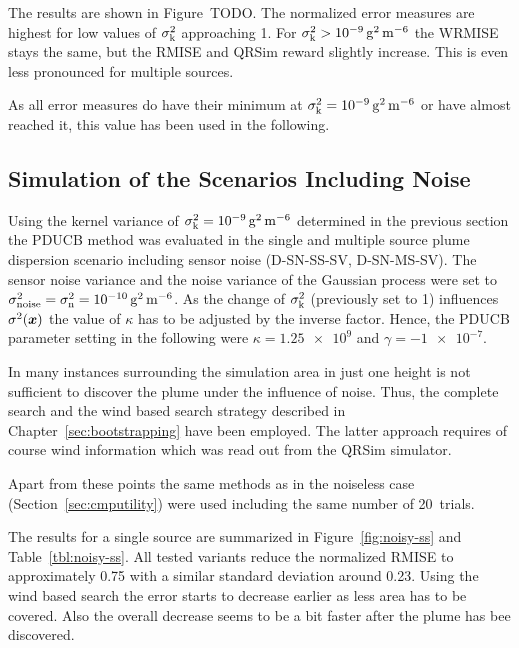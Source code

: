 The results are shown in Figure~TODO\@. The normalized error measures are 
highest for low values of $\sigma_{\mathrm{k}}^2$ approaching 1. For $\sigma\ped{k}^2 
> \SI{1e-9}{\gram\squared\per\meter\tothe{6}}$ the WRMISE stays the same, but 
the RMISE and QRSim reward slightly increase. This is even less pronounced for 
multiple sources.

As all error measures do have their minimum at $\sigma\ped{k}^2 
= \SI{1e-9}{\gram\squared\per\meter\tothe{6}}$ or have almost reached it, this 
value has been used in the following.

\subsection{Simulation of the Scenarios Including Noise}
Using the kernel variance of $\sigma\ped{k}^2 
= \SI{1e-9}{\gram\squared\per\meter\tothe{6}}$ determined in the previous 
section the PDUCB method was evaluated in the single and multiple source plume 
dispersion scenario including sensor noise (D-SN-SS-SV, D-SN-MS-SV). The sensor 
noise variance and the noise variance of the Gaussian process were set to 
$\sigma\ped{noise}^2 = \sigma\ped{n}^2 
= \SI{1e-10}{\gram\squared\per\meter\tothe{6}}$.  As the change of 
$\sigma_{\mathrm{k}}^2$ (previously set to 1) influences $\sigma^2(\bm{x})$ the value 
of $\kappa$ has to be adjusted by the inverse factor. Hence, the PDUCB parameter 
setting in the following were $\kappa = \num{1.25e9}$ and $\gamma 
= \num{-1e-7}$.

In many instances surrounding the simulation area in just one height is not 
sufficient to discover the plume under the influence of noise. Thus, the 
complete search and the wind based search strategy described in 
Chapter~\ref{sec:bootstrapping} have been employed. The latter approach requires 
of course wind information which was read out from the QRSim simulator.

Apart from these points the same methods as in the noiseless case 
(Section~\ref{sec:cmputility}) were used including the same number of 20~trials.

The results for a single source are summarized in Figure~\ref{fig:noisy-ss} and 
Table~\ref{tbl:noisy-ss}.  All tested variants reduce the normalized RMISE to 
approximately \num{0.75} with a similar standard deviation around \num{0.23}.  
Using the wind based search the error starts to decrease earlier as less area 
has to be covered.  Also the overall decrease seems to be a bit faster after the 
plume has bee discovered.

